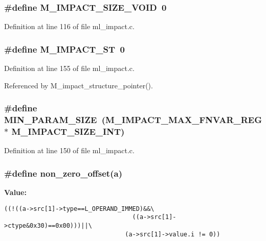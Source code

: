 \subsubsection{\setlength{\rightskip}{0pt plus 5cm}\#define M\_\-IMPACT\_\-SIZE\_\-VOID~0}\label{ml__impact_8c_d5a5ea699150eba483e34d459c997d10}




Definition at line 116 of file ml\_\-impact.c.
\subsubsection{\setlength{\rightskip}{0pt plus 5cm}\#define M\_\-IMPACT\_\-ST~0}\label{ml__impact_8c_cef6d0f0bca4ffa1764170c4d82e85ca}




Definition at line 155 of file ml\_\-impact.c.

Referenced by M\_\-impact\_\-structure\_\-pointer().
\subsubsection{\setlength{\rightskip}{0pt plus 5cm}\#define MIN\_\-PARAM\_\-SIZE~(M\_\-IMPACT\_\-MAX\_\-FNVAR\_\-REG $\ast$ M\_\-IMPACT\_\-SIZE\_\-INT)}\label{ml__impact_8c_48f1f5d33d6770a468f7767465e07abb}




Definition at line 150 of file ml\_\-impact.c.
\subsubsection{\setlength{\rightskip}{0pt plus 5cm}\#define non\_\-zero\_\-offset(a)}\label{ml__impact_8c_1a7d03fa0a676d3b09e555d8c8176f1b}


\textbf{Value:}

\begin{Code}\begin{verbatim}((!((a->src[1]->type==L_OPERAND_IMMED)&&\
                                   ((a->src[1]->ctype&0x30)==0x00)))||\
                                 (a->src[1]->value.i != 0))
\end{verbatim}\end{Code}
